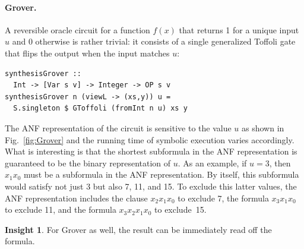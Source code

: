 \documentclass[sigplan,screen]{acmart}
\theoremstyle{definition}
\newtheorem*{insight}{Insight}
\begin{document}
\paragraph*{Grover.}
A reversible oracle circuit for a function $f(x)$ that returns 1 for a
unique input $u$ and 0 otherwise is rather trivial: it consists of a
single generalized Toffoli gate that flips the output when the input
matches $u$:
\begin{verbatim}
synthesisGrover :: 
  Int -> [Var s v] -> Integer -> OP s v
synthesisGrover n (viewL -> (xs,y)) u =
  S.singleton $ GToffoli (fromInt n u) xs y
\end{verbatim}
The ANF representation of the circuit is sensitive to the value
$u$ as shown in Fig.~\ref{fig:Grover} and the running time of symbolic
execution varies accordingly. What is interesting is that the shortest
subformula in the ANF representation is guaranteed to be the binary
representation of $u$. As an example, if $u=3$, then
$x_1x_0$ must be a subformula in the ANF representation. By itself,
this subformula would satisfy not just 3 but also 7, 11, and 15.  To
exclude this latter values, the ANF representation includes the clause
$x_2x_1x_0$ to exclude 7, the formula $x_3x_1x_0$ to exclude 11, and
the formula $x_3x_2x_1x_0$ to exclude~15. 

\begin{insight}
  For Grover as well, the result can be immediately read off the formula.
\end{insight}
\end{document}
